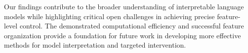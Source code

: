 \documentclass{article} %
\begin{document}
Our findings contribute to the broader understanding of interpretable language models while highlighting critical open challenges in achieving precise feature-level control. The demonstrated computational efficiency and successful feature organization provide a foundation for future work in developing more effective methods for model interpretation and targeted intervention.



\end{document}
